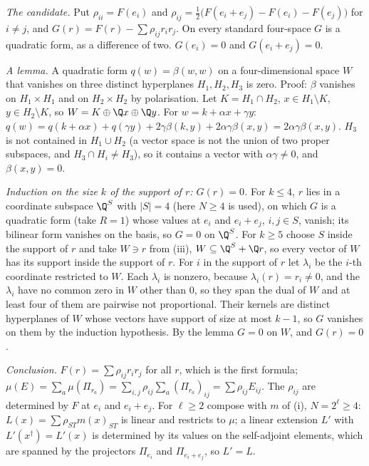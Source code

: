 \emph{The candidate.} Put $\rho_{ii} = F(e_{i})$ and $\rho_{ij} = \tfrac12\bigl(F(e_{i} + e_{j}) - F(e_{i}) - F(e_{j})\bigr)$ for $i \ne j$, and $G(r) = F(r) - \sum\rho_{ij}r_{i}r_{j}$. On every standard four-space $G$ is a quadratic form, as a difference of two. $G(e_{i}) = 0$ and $G(e_{i} + e_{j}) = 0$.

\emph{A lemma.} A quadratic form $q(w) = \beta(w,w)$ on a four-dimensional space $W$ that vanishes on three distinct hyperplanes $H_{1}, H_{2}, H_{3}$ is zero. Proof: $\beta$ vanishes on $H_{1} \times H_{1}$ and on $H_{2} \times H_{2}$ by polarisation. Let $K = H_{1} \cap H_{2}$, $x \in H_{1} \setminus K$, $y \in H_{2} \setminus K$, so $W = K \oplus \Q x \oplus \Q y$. For $w = k + \alpha x + \gamma y$: $q(w) = q(k + \alpha x) + q(\gamma y) + 2\gamma\beta(k,y) + 2\alpha\gamma\beta(x,y) = 2\alpha\gamma\beta(x,y)$. $H_{3}$ is not contained in $H_{1} \cup H_{2}$ (a vector space is not the union of two proper subspaces, and $H_{3} \cap H_{i} \ne H_{3}$), so it contains a vector with $\alpha\gamma \ne 0$, and $\beta(x,y) = 0$.

\emph{Induction on the size $k$ of the support of $r$: $G(r) = 0$.} For $k \le 4$, $r$ lies in a coordinate subspace $\Q^{S}$ with $|S| = 4$ (here $N \ge 4$ is used), on which $G$ is a quadratic form (take $R = 1$) whose values at $e_{i}$ and $e_{i} + e_{j}$, $i, j \in S$, vanish; its bilinear form vanishes on the basis, so $G = 0$ on $\Q^{S}$. For $k \ge 5$ choose $S$ inside the support of $r$ and take $W \ni r$ from (iii), $W \subseteq \Q^{S} + \Q r$, so every vector of $W$ has its support inside the support of $r$. For $i$ in the support of $r$ let $\lambda_{i}$ be the $i$-th coordinate restricted to $W$. Each $\lambda_{i}$ is nonzero, because $\lambda_{i}(r) = r_{i} \ne 0$, and the $\lambda_{i}$ have no common zero in $W$ other than $0$, so they span the dual of $W$ and at least four of them are pairwise not proportional. Their kernels are distinct hyperplanes of $W$ whose vectors have support of size at most $k - 1$, so $G$ vanishes on them by the induction hypothesis. By the lemma $G = 0$ on $W$, and $G(r) = 0$.

\emph{Conclusion.} $F(r) = \sum\rho_{ij}r_{i}r_{j}$ for all $r$, which is the first formula; $\mu(E) = \sum_{a}\mu(\Pi_{r_{a}}) = \sum_{i,j}\rho_{ij}\sum_{a}(\Pi_{r_{a}})_{ij} = \sum\rho_{ij}E_{ij}$. The $\rho_{ij}$ are determined by $F$ at $e_{i}$ and $e_{i} + e_{j}$. For $\ell \ge 2$ compose with $m$ of (i), $N = 2^{\ell} \ge 4$: $L(x) = \sum\rho_{ST}m(x)_{ST}$ is linear and restricts to $\mu$; a linear extension $L'$ with $L'(x^{\dagger}) = L'(x)$ is determined by its values on the self-adjoint elements, which are spanned by the projectors $\Pi_{e_{i}}$ and $\Pi_{e_{i} + e_{j}}$, so $L' = L$.

